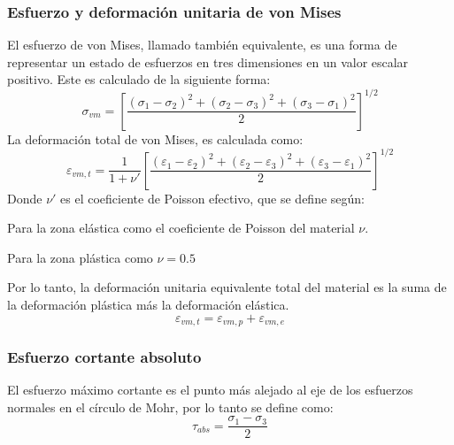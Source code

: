 \subsubsection{Esfuerzo y deformación unitaria de von Mises}
El esfuerzo de von Mises, llamado también equivalente, es una forma de representar un estado de esfuerzos en tres dimensiones en un valor escalar positivo. Este es calculado de la siguiente forma:
\begin{equation}
	\sigma_{vm} = \left[ \frac{(\sigma_1 - \sigma_2)^2 + (\sigma_2 - \sigma_3)^2 + (\sigma_3 - \sigma_1)^2}{2}\right]^{1/2}
\end{equation}
La deformación total de von Mises, es calculada como:
\begin{equation}
	\varepsilon_{vm,t} = \frac{1}{1+\nu'} \left[\frac{(\varepsilon_1 - \varepsilon_2)^2 + (\varepsilon_2 - \varepsilon_3)^2 + (\varepsilon_3 - \varepsilon_1)^2}{2}\right]^{1/2}
\end{equation}
Donde $\nu'$ es el coeficiente de Poisson efectivo, que se define según:
\begin{itemize*}
	\item Para la zona elástica como el coeficiente de Poisson del material $\nu$.
	\item Para la zona plástica como $\nu=0.5$
\end{itemize*}
Por lo tanto, la deformación unitaria equivalente total del material es la suma de la deformación plástica más la deformación elástica. 
\begin{equation}
	\varepsilon_{vm,t} = \varepsilon_{vm,p} + \varepsilon_{vm,e}
\end{equation}

\subsubsection{Esfuerzo cortante absoluto}
El esfuerzo máximo cortante es el punto más alejado al eje de los esfuerzos normales en el círculo de Mohr, por lo tanto se define como:
\begin{equation}
	\tau_{abs} = \frac{\sigma_1 - \sigma_3}{2}
\end{equation}

